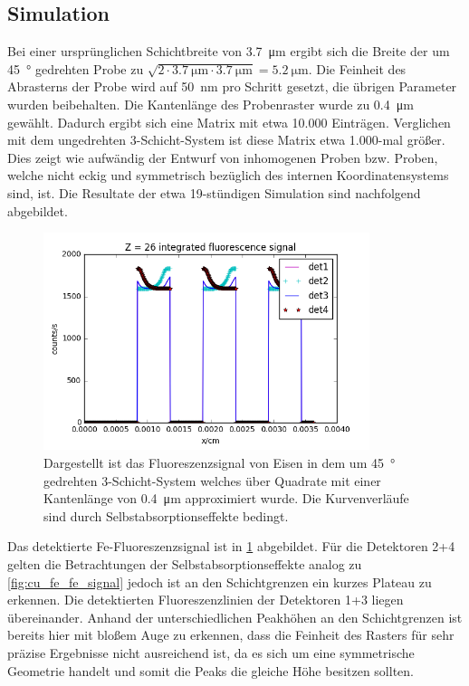 \subsection{Simulation}
Bei einer ursprünglichen Schichtbreite von \SI{3.7}{\micro\meter} ergibt sich die Breite der um \SI{45}{\degree} gedrehten Probe zu $\sqrt{2 \cdot \SI{3.7}{\micro\meter} \cdot \SI{3.7}{\micro\meter}} = \SI{5.2}{\micro\meter}$. Die Feinheit des Abrasterns der Probe wird auf \SI{50}{\nano\meter} pro Schritt gesetzt, die übrigen Parameter wurden beibehalten. Die Kantenlänge des Probenraster wurde zu \SI{0.4}{\micro\meter} gewählt. Dadurch ergibt sich eine Matrix mit etwa 10.000 Einträgen. Verglichen mit dem ungedrehten 3-Schicht-System ist diese Matrix etwa 1.000-mal größer. Dies zeigt wie aufwändig der Entwurf von inhomogenen Proben bzw. Proben, welche nicht eckig und symmetrisch bezüglich des internen Koordinatensystems sind, ist. Die Resultate der etwa 19-stündigen Simulation sind nachfolgend abgebildet.

\begin{figure}[H] 
  \centering
     \includegraphics[width=0.85\textwidth]{illustrations/45grad_fe.png}
  \caption[Fluoreszenzbild Eisen \SI{45}{\degree}-Probe]{Dargestellt ist das Fluoreszenzsignal von Eisen in dem um \SI{45}{\degree} gedrehten 3-Schicht-System welches über Quadrate mit einer Kantenlänge von \SI{0.4}{\micro\meter} approximiert wurde. Die Kurvenverläufe sind durch Selbstabsorptionseffekte bedingt.}
  \label{fig:45grad_fe}
\end{figure}

Das detektierte Fe-Fluoreszenzsignal ist in \cref{fig:45grad_fe} abgebildet. Für die Detektoren 2+4 gelten die Betrachtungen der Selbstabsorptionseffekte analog zu \cref{fig:cu_fe_fe_signal} jedoch ist an den Schichtgrenzen ein kurzes Plateau zu erkennen. Die detektierten Fluoreszenzlinien der Detektoren 1+3 liegen übereinander. Anhand der unterschiedlichen Peakhöhen an den Schichtgrenzen ist bereits hier mit bloßem Auge zu erkennen, dass die Feinheit des Rasters für sehr präzise Ergebnisse nicht ausreichend ist, da es sich um eine symmetrische Geometrie handelt und somit die Peaks die gleiche Höhe besitzen sollten.


